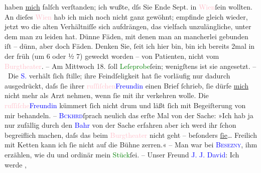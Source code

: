                haben \uline{mich} falſch verſtanden; ich wußte, dſs Sie Ende
               Sept. in \textcolor{pink}{Wien}{}\ledrightnote{\textcolor{pink}{Wien}}{ }ſein wollten. An dieſes \textcolor{pink}{Wien}{}\ledrightnote{\textcolor{pink}{Wien}} hab ich mich noch nicht ganz gewöhnt; empfinde gleich wieder, jetzt wo
               die alten Verhältniſſe sich aufdrängen, das vielfach unzulängliche, unter dem man zu
               leiden hat. Dünne Fäden, mit denen {\pb}man an mancherlei
               gebunden iſt – dünn, aber doch Fäden. Denken Sie, ſeit ich hier bin, bin ich bereits
               2mal in der früh \introOben{}(um 6 oder ½ 7)\introOben{} geweckt worden – von
               Patienten, nicht vom \textcolor{pink}{Burgtheater}{}\ledrightnote{\textcolor{pink}{Burgtheater}}. – Am Mittwoch 18.
               ſoll \textcolor{green}{Leſeprobe}{}ſein; wenigſtens ist sie angesetzt.\pend
           \pstart
           – Die \textcolor{blue}{S.}{}\ledrightnote{\textcolor{blue}{Adele Sandrock}} verhält ſich ſtille; ihre Feindſeligkeit
               hat ſie vorläufig nur dadurch ausgedrückt, daſs ſie ihrer \textcolor{pink}{ruſſiſchen}{}\ledrightnote{\textcolor{pink}{Russland}}{ }\textcolor{blue}{Freundin}{} einen Brief ſchrieb,
               ſie dürfe \uline{mich} nicht mehr als Arzt nehmen, wenn ſie
               mit ihr verkehren wolle. Die \textcolor{pink}{ruſſiſche}{}\ledrightnote{\textcolor{pink}{Russland}}{ }\textcolor{blue}{Freundin}{} kümmert ſich nicht
               drum {\pb}und läßt ſich mit Begeiſterung von mir
               behandeln. – \textcolor{blue}{\textsc{Bckhrd}}{}\ledrightnote{\textcolor{blue}{Max Eugen Burckhard}}{ }ſprach neulich das erſte Mal von der Sache: »Ich
               hab ja nur zufällig durch den \textcolor{blue}{Bahr}{}\ledrightnote{\textcolor{blue}{Hermann Bahr}} von der Sache
               erfahren {\dotstwo} aber ich werd ihr ſchon begreiflich machen,
               daſs das beim \textcolor{pink}{Burgtheater}{}\ledrightnote{\textcolor{pink}{Burgtheater}} nicht geht – beſonders \uline{ſie}{\dots} Freilich mit Ketten kann ich ſie nicht auf die Bühne
               zerren.« – Man war bei \textcolor{blue}{\textsc{Besezny}}{}\ledrightnote{\textcolor{blue}{Josef von Bezecný}}, ihm erzählen, wie du{\geminationm} und ordinär mein \textcolor{green}{Stück}{}ſei. – Unser Freund \textcolor{blue}{J. J. David}{}\ledrightnote{\textcolor{blue}{Jakob Julius David}}: Ich werde \label{K_L00483_1v}\label{K_L00483_1h},
